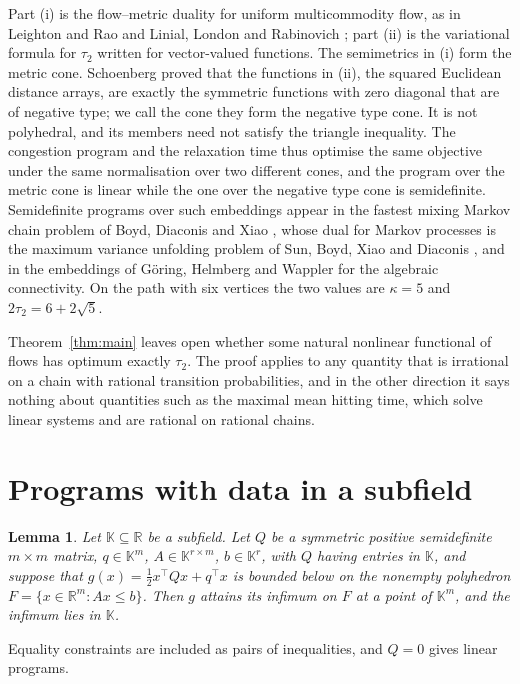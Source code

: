 \documentclass[11pt]{amsart}
\newtheorem{lemma}[theorem]{Lemma}
\theoremstyle{remark}
\numberwithin{equation}{section}
\newcommand{\R}{\mathbb R}
\newcommand{\K}{\mathbb K}
\begin{document}
Part (i) is the flow--metric duality for uniform multicommodity flow, as in Leighton and Rao \cite{LR} and Linial, London and Rabinovich \cite{LLR}; part (ii) is the variational formula for $\tau_2$ written for vector-valued functions. The semimetrics in (i) form the metric cone. Schoenberg \cite{Sch} proved that the functions in (ii), the squared Euclidean distance arrays, are exactly the symmetric functions with zero diagonal that are of negative type; we call the cone they form the negative type cone. It is not polyhedral, and its members need not satisfy the triangle inequality. The congestion program and the relaxation time thus optimise the same objective under the same normalisation over two different cones, and the program over the metric cone is linear while the one over the negative type cone is semidefinite. Semidefinite programs over such embeddings appear in the fastest mixing Markov chain problem of Boyd, Diaconis and Xiao \cite{BDX}, whose dual for Markov processes is the maximum variance unfolding problem of Sun, Boyd, Xiao and Diaconis \cite{SBXD}, and in the embeddings of G\"oring, Helmberg and Wappler \cite{GHW} for the algebraic connectivity. On the path with six vertices the two values are $\kappa=5$ and $2\tau_2=6+2\sqrt5$.

Theorem~\ref{thm:main} leaves open whether some natural nonlinear functional of flows has optimum exactly $\tau_2$. The proof applies to any quantity that is irrational on a chain with rational transition probabilities, and in the other direction it says nothing about quantities such as the maximal mean hitting time, which solve linear systems and are rational on rational chains.

\section{Programs with data in a subfield}

\begin{lemma}\label{lem:field}
Let $\K\subseteq\R$ be a subfield. Let $Q$ be a symmetric positive semidefinite $m\times m$ matrix, $q\in\K^m$, $A\in\K^{r\times m}$, $b\in\K^r$, with $Q$ having entries in $\K$, and suppose that $g(x)=\frac12x^\top Qx+q^\top x$ is bounded below on the nonempty polyhedron $F=\{x\in\R^m: Ax\le b\}$. Then $g$ attains its infimum on $F$ at a point of $\K^m$, and the infimum lies in $\K$.
\end{lemma}

Equality constraints are included as pairs of inequalities, and $Q=0$ gives linear programs.
\end{document}
